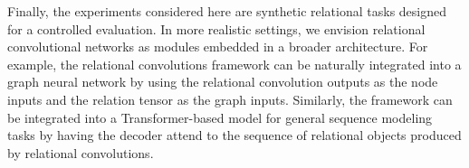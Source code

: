 Finally, the experiments considered here are synthetic relational tasks designed for a controlled evaluation. In more realistic settings, we envision relational convolutional networks as modules embedded in a broader architecture. For example, the relational convolutions framework can be naturally integrated into a graph neural network by using the relational convolution outputs as the node inputs and the relation tensor as the graph inputs. Similarly, the framework can be integrated into a Transformer-based model for general sequence modeling tasks by having the decoder attend to the sequence of relational objects produced by relational convolutions.